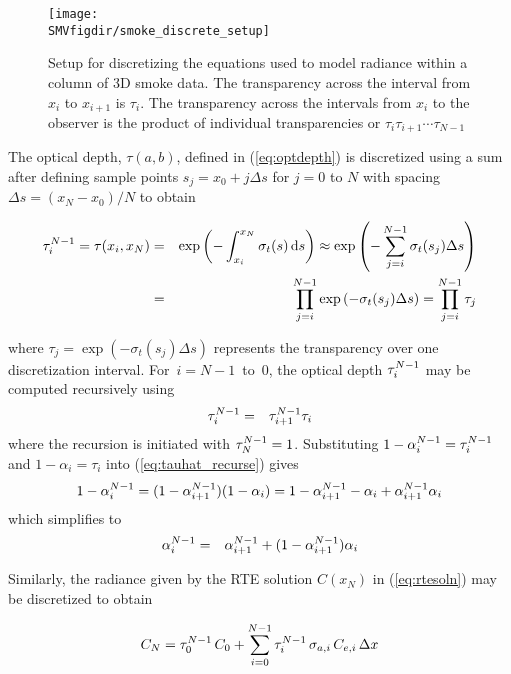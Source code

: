 \begin{figure}[bph]
\begin{center}
\texttt{[image: \\SMVfigdir/smoke\_discrete\_setup]}
\end{center}
\caption[Setup for discretizing the equations used to model
radiance within a column of 3D smoke data.]{Setup for discretizing
the equations used to model radiance within a column of 3D smoke
data. The transparency across the interval from $x_i$ to $x_{i+1}$
is $\tau_i$. The transparency across the intervals from $x_i$ to
the observer is the product of individual transparencies or
$\tau_i\tau_{i+1}\cdots\tau_{N-1}$} \label{fig:smokediscretesetup}
\end{figure}

The optical depth, $\tau(a,b)$, defined in (\ref{eq:optdepth}) is
discretized using a sum  after defining sample points
$s_j=x_0+j\Delta s$ for $j=0$ to $N$ with spacing $\Delta
s=(x_N-x_0)/N$ to obtain

\begin{eqnarray}
\tau_{i}^{N-1}=\tau(x_i,x_N)&=&\exp\left(-\int_{x_i}^{x_N}\sigma_t(s)\,\mbox{d}s\right)\approx\exp\left(-\sum_{j=i}^{N-1}\sigma_t(s_j)\Delta s\right)\\
&=&\prod_{j=i}^{N-1}\exp\left(-\sigma_t(s_j)\Delta s\right)=\prod_{j=i}^{N-1}\tau_j
\end{eqnarray}

\noindent where $\tau_j=\exp\left(-\sigma_t(s_j)\Delta s\right)$
represents the transparency over one discretization interval.
For~$i=N-1$~to~$0$, the optical depth $\tau_{i}^{N-1}$ may be computed
recursively using
\begin{eqnarray}
\label{eq:tauhat_recurse}
\tau_{i}^{N-1}&=&\tau_{i+1}^{N-1}\tau_i
\end{eqnarray}
\noindent where the recursion is initiated with $\tau_{N}^{N-1}=1$.
Substituting $1-\alpha_{i}^{N-1}=\tau_{i}^{N-1}$ and $1-\alpha_i=\tau_i$ into
(\ref{eq:tauhat_recurse}) gives
\begin{eqnarray}
1-\alpha_{i}^{N-1}=(1-\alpha_{i+1}^{N-1})(1-\alpha_i)=1-\alpha_{i+1}^{N-1} - \alpha_i + \alpha_{i+1}^{N-1}\alpha_i
\end{eqnarray}
which simplifies to
\begin{eqnarray}
\label{eq:alpha2}
\alpha_{i}^{N-1}&=&\alpha_{i+1}^{N-1} + (1-\alpha_{i+1}^{N-1})\alpha_i
\end{eqnarray}

Similarly, the radiance given by the RTE solution $C(x_N)$ in
(\ref{eq:rtesoln}) may be discretized to obtain

\begin{eqnarray}
C_{N} = \tau_{0}^{N-1}\,C_0 +
\sum_{i=0}^{N-1}\tau_{i}^{N-1}\,\sigma_{a,i}\,C_{e,i}\,\Delta x
\end{eqnarray}

